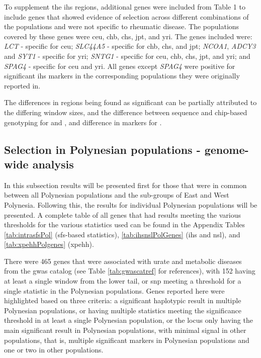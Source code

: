 \documentclass[twoside,openright]{report}
\begin{document}
To supplement the \citet{Ramos2017} \gls{ihs} regions, additional genes
were included from \citet{voight2006map} Table 1 to include genes that
showed evidence of selection across different combinations of the
populations and were not specific to rheumatic disease. The populations
covered by these genes were \gls{ceu}, \gls{chb}, \gls{chs}, \gls{jpt},
and \gls{yri}. The genes included were: \emph{LCT} - specific for
\gls{ceu}; \emph{SLC44A5} - specific for \gls{chb}, \gls{chs}, and
\gls{jpt}; \emph{NCOA1}, \emph{ADCY3} and \emph{SYT1} - specific for
\gls{yri}; \emph{SNTG1} - specific for \gls{ceu}, \gls{chb}, \gls{chs},
\gls{jpt}, and \gls{yri}; and \emph{SPAG4} - specific for \gls{ceu} and
\gls{yri}. All genes except \emph{SPAG4} were positive for significant
\gls{ihs} markers in the corresponding populations they were originally
reported in.

The differences in regions being found as significant can be partially
attributed to the differing window sizes, and the difference between
sequence and chip-based genotyping for \citet{Hider2013} and
\citet{Jonnalagadda2017}, and difference in markers for
\citet{Ramos2017}.

\FloatBarrier

\subsection{Selection in Polynesian populations - genome-wide
analysis}\label{selection-in-polynesian-populations---genome-wide-analysis}

In this subsection results will be presented first for those that were
in common between all Polynesian populations and the sub-groups of East
and West Polynesia. Following this, the results for individual
Polynesian populations will be presented. A complete table of all genes
that had results meeting the various thresholds for the various
statistics used can be found in the Appendix Tables
\ref{tab:intrasfsPol} (\gls{sfs}-based statistics),
\ref{tab:ihsnslPolGenes} (\gls{ihs} and \gls{nsl}), and
\ref{tab:xpehhPolgenes} (\gls{xpehh}).

There were 465 genes that were associated with urate and metabolic
diseases from the \gls{gwas} catalog (see Table \ref{tab:gwascatref} for
references), with 152 having at least a single window from the lower
tail, or \gls{snp} meeting a threshold for a single statistic in the
Polynesian populations. Genes reported here were highlighted based on
three criteria: a significant haplotypic result in multiple Polynesian
populations, or having multiple statistics meeting the significance
threshold in at least a single Polynesian population, or the locus only
having the main significant result in Polynesian populations, with
minimal signal in other populations, that is, multiple significant
markers in Polynesian populations and one or two in other populations.
\end{document}
